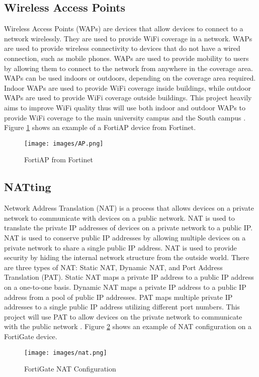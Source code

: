 \documentclass[12pt]{report}
\begin{document}
\subsection{Wireless Access Points}
Wireless Access Points (WAPs) are devices that allow devices to connect to a network wirelessly. They are used to provide WiFi coverage in a network. WAPs are used to provide wireless connectivity to devices that do not have a wired connection, such as mobile phones. WAPs are used to provide mobility to users by allowing them to connect to the network from anywhere in the coverage area. WAPs can be used indoors or outdoors, depending on the coverage area required. Indoor WAPs are used to provide WiFi coverage inside buildings, while outdoor WAPs are used to provide WiFi coverage outside buildings. This project heavily aims to improve WiFi quality thus will use both indoor and outdoor WAPs to provide WiFi coverage to the main university campus and the South campus \cite{FortiAP}.
Figure \ref{fig:FortiAP} shows an example of a FortiAP device from Fortinet. 
\begin{figure}[h]
    \centering
    \texttt{[image: images/AP.png]}
    \caption{FortiAP from Fortinet \cite{FAPIMG}}
    \label{fig:FortiAP}
\end{figure}

\subsection{NATting}
Network Address Translation (NAT) is a process that allows devices on a private network to communicate with devices on a public network. NAT is used to translate the private IP addresses of devices on a private network to a public IP. NAT is used to conserve public IP addresses by allowing multiple devices on a private network to share a single public IP address. NAT is used to provide security by hiding the internal network structure from the outside world. There are three types of NAT: Static NAT, Dynamic NAT, and Port Address Translation (PAT). Static NAT maps a private IP address to a public IP address on a one-to-one basis. Dynamic NAT maps a private IP address to a public IP address from a pool of public IP addresses. PAT maps multiple private IP addresses to a single public IP address utilizing different port numbers. This project will use PAT to allow devices on the private network to communicate with the public network \cite{NATTing}. Figure \ref{fig:NAT} shows an example of NAT configuration on a FortiGate device.
\begin{figure}[h]
    \centering
    \texttt{[image: images/nat.png]}
    \caption{FortiGate NAT Configuration}
    \label{fig:NAT}
\end{figure}
\end{document}
